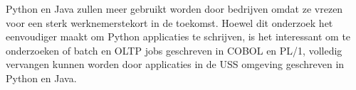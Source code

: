 Python en Java zullen meer gebruikt worden door bedrijven omdat ze vrezen voor een sterk werknemerstekort in de toekomst. Hoewel dit onderzoek het eenvoudiger maakt om Python applicaties te schrijven, is het interessant om te onderzoeken of batch en OLTP jobs geschreven in COBOL en PL/1, volledig vervangen kunnen worden door applicaties in de USS omgeving geschreven in Python en Java. \\

